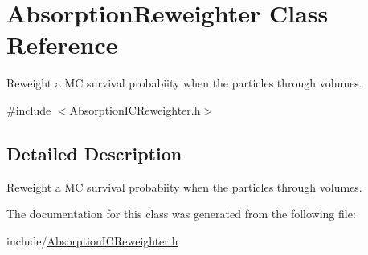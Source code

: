 \hypertarget{class_absorption_reweighter}{\section{Absorption\-Reweighter Class Reference}
\label{class_absorption_reweighter}
}


Reweight a M\-C survival probabiity when the particles through volumes.  




{\ttfamily \#include $<$Absorption\-I\-C\-Reweighter.\-h$>$}



\subsection{Detailed Description}
Reweight a M\-C survival probabiity when the particles through volumes. 

The documentation for this class was generated from the following file\-:\begin{DoxyCompactItemize}
\item 
include/\hyperlink{_absorption_i_c_reweighter_8h}{Absorption\-I\-C\-Reweighter.\-h}\end{DoxyCompactItemize}
